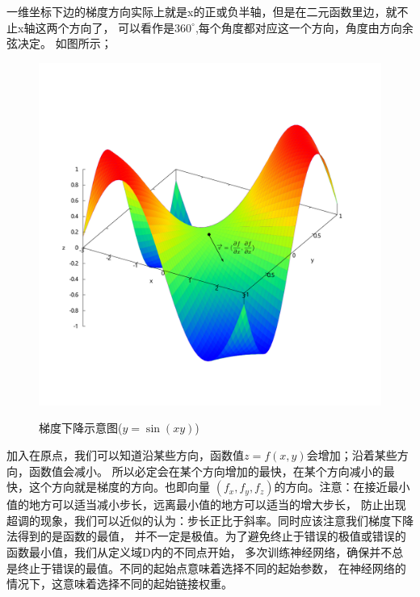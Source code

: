 \documentclass[12pt]{article}
\begin{document}
    一维坐标下边的梯度方向实际上就是x的正或负半轴，但是在二元函数里边，就不止x轴这两个方向了，
    可以看作是$360^{\circ}$,每个角度都对应这一个方向，角度由方向余弦决定。
    如图所示；
    \begin{figure}[!htb]
        \centering
        \includegraphics[scale=0.5]{./picture/Gratitude_Note.pdf}
        \label{梯度下降}
        \caption{梯度下降示意图($y=\sin(xy)$)}
    \end{figure}
    加入在原点，我们可以知道沿某些方向，函数值$z=f(x,y)$会增加；沿着某些方向，函数值会减小。
    所以必定会在某个方向增加的最快，在某个方向减小的最快，这个方向就是梯度的方向。也即向量
    $(f_x,f_y,f_z)$的方向。注意：在接近最小值的地方可以适当减小步长，远离最小值的地方可以适当的增大步长，
    防止出现超调的现象，我们可以近似的认为：步长正比于斜率。同时应该注意我们梯度下降法得到的是函数的最值，
    并不一定是极值。为了避免终止于错误的极值或错误的函数最小值，我们从定义域D内的不同点开始，
    多次训练神经网络，确保并不总是终止于错误的最值。不同的起始点意味着选择不同的起始参数，
    在神经网络的情况下，这意味着选择不同的起始链接权重。
\end{document}
